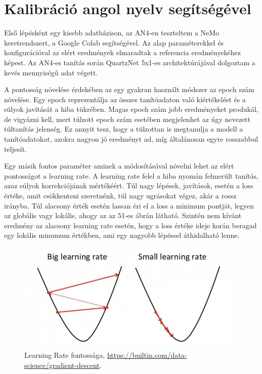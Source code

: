 \section{Kalibráció angol nyelv segítségével}

Első lépésként egy kisebb adatbázison, az AN4-en teszteltem a NeMo keretrendszert, a Google Colab segítségével. Az alap paraméterekkel és konfigurációval az elért eredmények elmaradtak a referencia eredményekéhez képest. Az AN4-es tanítás során QuartzNet 5x1-es architektúrájával dolgoztam a kevés mennyiségű adat végett.

A pontosság növelése érdekében az egy gyakran használt módszer az epoch szám növelése. Egy epoch reprezentálja az összes tanítóadaton való kiértékelést és a súlyok javítását a hiba tükrében. Magas epoch szám jobb eredményeket produkál, de vigyázni kell, mert túlzott epoch szám esetében megjelenhet az úgy nevezett túltanítás jelenség. Ez annyit tesz, hogy a túlzottan is megtanulja a modell a tanítóadatokat, azokra nagyon jó eredményt ad, míg általánosan egyre rosszabbul teljesít.

Egy másik fontos paraméter aminek a módosításával növelni lehet az elért pontosságot a learning rate. A learning rate felel a hiba nyomán felmerült tanítás, azaz súlyok korrekciójának mértékéért. Túl nagy lépések, javítások, esetén a loss értéke, amit csökkenteni szeretnénk, túl nagy ugrásokat végez, akár a rossz irányba. Túl alacsony érték esetén lassan éri el a loss a minimum pontját, legyen az globális vagy lokális, ahogy az az 51-es ábrán látható. Szintén nem kívánt eredmény az alacsony learning rate esetén, hogy a loss értéke ideje korán beragad egy lokális minumum értékben, ami egy nagyobb lépéssel áthidalható lenne.

\begin{figure}[!ht]
\centering
\includegraphics[width=150mm, keepaspectratio]{figures/gradient-descent-learning-rate.png}
\caption{Learning Rate fontossága, \url{https://builtin.com/data-science/gradient-descent}.}
\end{figure}

